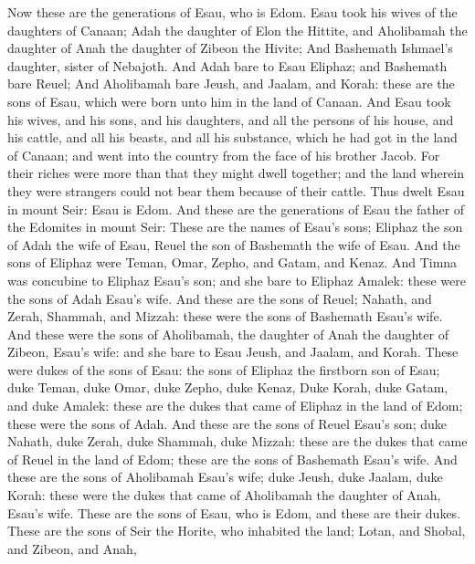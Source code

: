 \begin{biblechapter} %
 Now these are the generations of Esau, who is Edom.
\verse Esau took his wives of the daughters of Canaan; Adah the daughter of Elon the Hittite, and Aholibamah the daughter of Anah the daughter of Zibeon the Hivite;
\verse And Bashemath Ishmael's daughter, sister of Nebajoth.
\verse And Adah bare to Esau Eliphaz; and Bashemath bare Reuel;
\verse And Aholibamah bare Jeush, and Jaalam, and Korah: these are the sons of Esau, which were born unto him in the land of Canaan.
\verse And Esau took his wives, and his sons, and his daughters, and all the persons of his house, and his cattle, and all his beasts, and all his substance, which he had got in the land of Canaan; and went into the country from the face of his brother Jacob.
\verse For their riches were more than that they might dwell together; and the land wherein they were strangers could not bear them because of their cattle.
\verse Thus dwelt Esau in mount Seir: Esau is Edom.
\verse And these are the generations of Esau the father of the Edomites in mount Seir:
\verse These are the names of Esau's sons; Eliphaz the son of Adah the wife of Esau, Reuel the son of Bashemath the wife of Esau.
\verse And the sons of Eliphaz were Teman, Omar, Zepho, and Gatam, and Kenaz.
\verse And Timna was concubine to Eliphaz Esau's son; and she bare to Eliphaz Amalek: these were the sons of Adah Esau's wife.
\verse And these are the sons of Reuel; Nahath, and Zerah, Shammah, and Mizzah: these were the sons of Bashemath Esau's wife.
\verse And these were the sons of Aholibamah, the daughter of Anah the daughter of Zibeon, Esau's wife: and she bare to Esau Jeush, and Jaalam, and Korah.
\verse These were dukes of the sons of Esau: the sons of Eliphaz the firstborn son of Esau; duke Teman, duke Omar, duke Zepho, duke Kenaz,
\verse Duke Korah, duke Gatam, and duke Amalek: these are the dukes that came of Eliphaz in the land of Edom; these were the sons of Adah.
\verse And these are the sons of Reuel Esau's son; duke Nahath, duke Zerah, duke Shammah, duke Mizzah: these are the dukes that came of Reuel in the land of Edom; these are the sons of Bashemath Esau's wife.
\verse And these are the sons of Aholibamah Esau's wife; duke Jeush, duke Jaalam, duke Korah: these were the dukes that came of Aholibamah the daughter of Anah, Esau's wife.
\verse These are the sons of Esau, who is Edom, and these are their dukes.
\verse These are the sons of Seir the Horite, who inhabited the land; Lotan, and Shobal, and Zibeon, and Anah,

\end{biblechapter}
